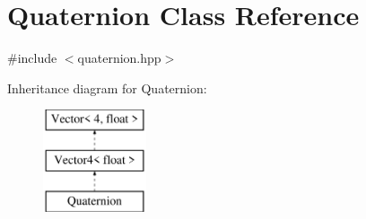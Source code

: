 \hypertarget{class_quaternion}{}\section{Quaternion Class Reference}
\label{class_quaternion}


{\ttfamily \#include $<$quaternion.\+hpp$>$}

Inheritance diagram for Quaternion\+:\begin{figure}[H]
\begin{center}
\leavevmode
\includegraphics[height=3.000000cm]{class_quaternion}
\end{center}
\end{figure}
